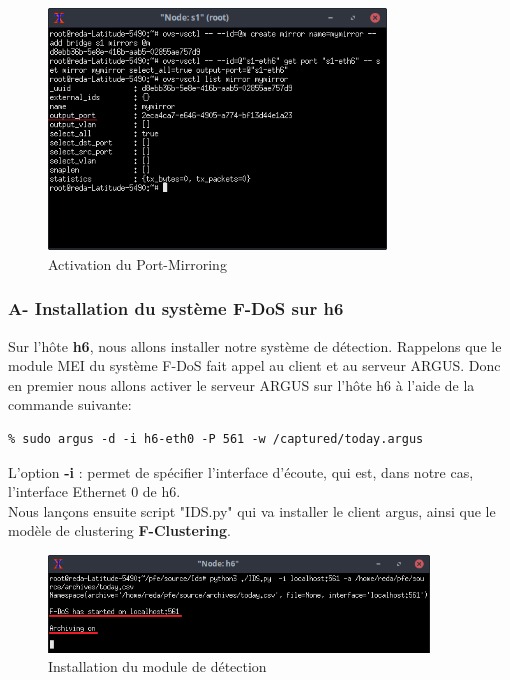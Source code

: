 \begin{figure}[h]
\centering
\includegraphics[width=0.8\textwidth]{Figures/simulation/mininet/switch/create_mirroring_port}
\decoRule
\caption{Activation du Port-Mirroring}
\label{fig:portMirroring}
\end{figure}

\newpage
\subsubsection{A- Installation du système F-DoS sur h6}
Sur l'hôte \textbf{h6}, nous allons installer notre système de détection. Rappelons que le module MEI du système F-DoS fait appel au client et au serveur ARGUS. Donc en premier nous allons activer le serveur ARGUS sur l'hôte h6 à l'aide de la commande suivante:
\begin{verbatim}
% sudo argus -d -i h6-eth0 -P 561 -w /captured/today.argus
\end{verbatim}
L'option \textbf{-i} : permet de spécifier l'interface d'écoute, qui est, dans notre cas, l'interface Ethernet 0 de h6.\\

\noindent Nous lançons ensuite script "IDS.py" qui va installer le client argus, ainsi que le modèle de clustering \textbf{F-Clustering}.
\begin{figure}[h]
\centering
\includegraphics[width=0.9\textwidth]{Figures/simulation/mininet/IDS/start}
\decoRule
\caption{Installation du module de détection}
\label{fig:fileServer}
\end{figure}
\newpage

